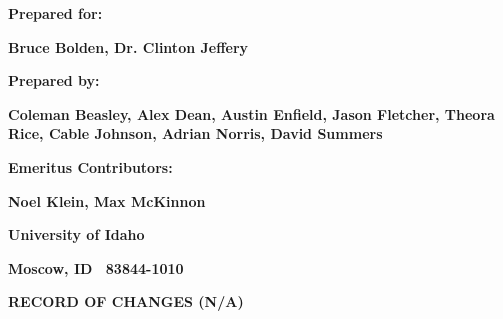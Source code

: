 \documentclass[twoside,letterpaper]{article}
\begin{document}
\bigskip

{\centering{}\bfseries\color{black}
Prepared for:
\par}

{\centering{}\bfseries\color{black}
Bruce Bolden, Dr. Clinton Jeffery
\par}

\bigskip

\bigskip

{\centering{}\bfseries\color{black}
Prepared by:
\par}

{\centering{}\bfseries\color{black}
Coleman Beasley, Alex Dean, Austin Enfield, Jason Fletcher, Theora Rice, Cable Johnson, Adrian Norris, David Summers
\par}

\bigskip

{\centering{}\bfseries\color{black}
Emeritus Contributors:
\par}

{\centering{}\bfseries\color{black}
Noel Klein, Max McKinnon
\par}

\bigskip
\bigskip

{\centering{}\bfseries\color{black}
University of Idaho
\par}

{\centering{}\bfseries\color{black}
Moscow, ID \ 83844-1010
\par}



\bigskip

{\centering{}\bfseries\color{black}
RECORD OF CHANGES (N/A)
\par}


\bigskip
\end{document}
